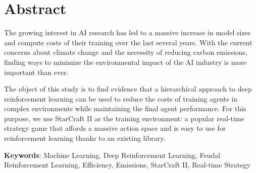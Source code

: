 \chapter*{Abstract}

The growing interest in AI research has led to a massive increase in model sizes and compute costs of their training over the last several years. With the current concerns about climate change and the necessity of reducing carbon emissions, finding ways to minimize the environmental impact of the AI industry is more important than ever.

The object of this study is to find evidence that a hierarchical approach to deep reinforcement learning can be used to reduce the costs of training agents in complex environments while maintaining the final agent performance. For this purpose, we use StarCraft II as the training environment: a popular real-time strategy game that affords a massive action space and is easy to use for reinforcement learning thanks to an existing library.

\vspace{1.5cm}

\textbf{Keywords}: Machine Learning, Deep Reinforcement Learning, Feudal Reinforcement Learning, Efficiency, Emissions, StarCraft II, Real-time Strategy